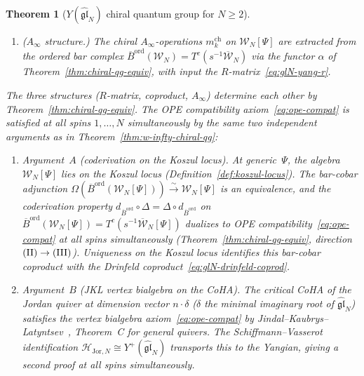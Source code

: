 \documentclass[11pt,reqno]{amsart}
\newtheorem{theorem}{Theorem}[section]
\theoremstyle{definition}
\theoremstyle{remark}
\newcommand{\cH}{\mathcal{H}}
\newcommand{\cW}{\mathcal{W}}
\newcommand{\Ainf}{A_{\infty}}
\newcommand{\Barord}{\overline{B}^{\mathrm{ord}}}
\newcommand{\CC}{\mathbb{C}}
\numberwithin{equation}{section}
\begin{document}
\begin{theorem}[$Y(\widehat{\mathfrak{gl}}_N)$ chiral
quantum group for $N \geq 2$]
\begin{enumerate}[label=\textup{(\Roman*)}]
\begin{equation}
    = \sum_{\sigma \in S_N}
    \mathrm{sgn}(\sigma)\,
    \prod_{i=1}^{N}
    T_{i,\sigma(i)}\bigl(u - (i-1)\Psi\bigr)
  \end{equation}
  is \emph{central} in $Y(\mathfrak{gl}_N)$: it commutes
  with all $t_{ij}(v)$. In the evaluation representation,
  $\mathrm{qdet}\, T(u)$ is proportional to the identity
  on~$\CC^N$ \textup{(}verified numerically at
  $N = 2, 3$\textup{)}.
  The $\Psi$-shift $u \mapsto u - (i-1)\Psi$
  is the quantum correction to the classical determinant
  $\det T(u)$.
\item \textup{($\Ainf$ structure.)}
  The chiral $\Ainf$-operations $m_k^{\mathrm{ch}}$ on
  $\cW_N[\Psi]$ are extracted from the ordered bar complex
  $\Barord(\cW_N) = T^c(s^{-1}\overline{\cW}_N)$ via the
  functor $\alpha$ of
  Theorem~\textup{\ref{thm:chiral-qg-equiv}}, with
  input the $R$-matrix~\eqref{eq:glN-yang-r}.
\end{enumerate}
The three structures \textup{(}$R$-matrix, coproduct,
$\Ainf$\textup{)} determine each other by
Theorem~\textup{\ref{thm:chiral-qg-equiv}}.
The OPE compatibility axiom~\eqref{eq:ope-compat}
is satisfied at all spins $1, \ldots, N$ simultaneously
by the same two independent arguments as in
Theorem~\textup{\ref{thm:w-infty-chiral-qg}}:
\begin{enumerate}[label=\textup{(\alph*)}]
\item \emph{Argument~$A$ \textup{(}coderivation on the
  Koszul locus\textup{)}.}
  At generic~$\Psi$, the algebra $\cW_N[\Psi]$ lies on the
  Koszul locus
  \textup{(}Definition~\textup{\ref{def:koszul-locus}}\textup{)}.
  The bar-cobar adjunction
  $\Omega(\Barord(\cW_N[\Psi]))
  \xrightarrow{\;\sim\;} \cW_N[\Psi]$
  is an equivalence, and the coderivation property
  $d_{\Barord} \circ \Delta = \Delta \circ d_{\Barord}$
  on $\Barord(\cW_N[\Psi]) = T^c(s^{-1}\overline{\cW}_N[\Psi])$
  dualizes to OPE
  compatibility~\eqref{eq:ope-compat} at all spins
  simultaneously
  \textup{(}Theorem~\textup{\ref{thm:chiral-qg-equiv}},
  direction $\textup{(II)} \to \textup{(III)}$\textup{)}.
  Uniqueness on the Koszul locus identifies this bar-cobar
  coproduct with the Drinfeld
  coproduct~\eqref{eq:glN-drinfeld-coprod}.
\item \emph{Argument~$B$ \textup{(}JKL vertex bialgebra
  on the CoHA\textup{)}.}
  The critical CoHA of the Jordan quiver at dimension
  vector $n \cdot \delta$ ($\delta$ the minimal imaginary
  root of $\widehat{\mathfrak{gl}}_N$) satisfies the vertex
  bialgebra axiom~\eqref{eq:ope-compat} by
  Jindal--Kaubrys--Latyntsev~\textup{\cite{JKL26}},
  Theorem~C for general quivers. The
  Schiffmann--Vasserot identification
  $\cH_{\mathrm{Jor},N} \cong Y^+(\widehat{\mathfrak{gl}}_N)$
  transports this to the Yangian, giving a second proof
  at all spins simultaneously.
\end{enumerate}
\end{theorem}
\end{document}
